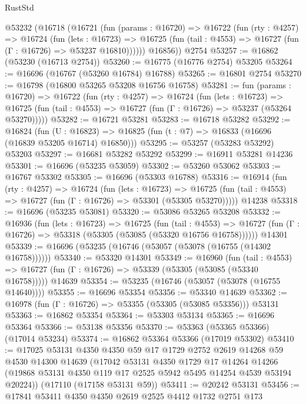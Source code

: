 \begin{lexlean}{RustStd}
\begin{coremodule}
    @53232
      (@16718
        (@16721
          (fun (params : @16720) =>
          @16722
            (fun (rty : @4257) =>
            @16724
              (fun (lets : @16723) =>
              @16725 (fun (tail : @4553) => @16727 (fun (Γ : @16726) => @53237 @16810))))))
        @16856))
    @2754
@53257 := @16862 (@53230 (@16713 @2754))
@53260 := @16775 (@16776 @2754) @53205
@53264 := @16696 (@16767 (@53260 @16784) @16788)
@53265 := @16801 @2754
@53270 := @16798 (@16800 @53265 @53208 @16756 @16758)
@53281 := fun (params : @16720) =>
  @16722
    (fun (rty : @4257) =>
    @16724
      (fun (lets : @16723) =>
      @16725 (fun (tail : @4553) => @16727 (fun (Γ : @16726) => @53237 (@53264 @53270)))))
@53282 := @16721 @53281
@53283 := @16718 @53282
@53292 := @16824
    (fun (U : @16823) => @16825 (fun (t : @7) => @16833 (@16696 (@16839 @53205 @16714) @16850)))
@53295 := @53257 (@53283 @53292) @53203
@53297 := @16681 @53282 @53292
@53299 := @16911 @53281 @14236
@53301 := @16696 (@53235 @53059)
@53302 := @53260 @53062
@53303 := @16767 @53302
@53305 := @16696 (@53303 @16788)
@53316 := @16914
    (fun (rty : @4257) =>
    @16724
      (fun (lets : @16723) =>
      @16725 (fun (tail : @4553) => @16727 (fun (Γ : @16726) => @53301 (@53305 @53270)))))
    @14238
@53318 := @16696 (@53235 @53081)
@53320 := @53086 @53265 @53208
@53332 := @16936
    (fun (lets : @16723) =>
    @16725
      (fun (tail : @4553) =>
      @16727 (fun (Γ : @16726) => @53318 (@53305 (@53085 (@53320 @16756 @16758))))))
    @14301
@53339 := @16696 (@53235 (@16746 (@53057 (@53078 (@16755 (@14302 @16758))))))
@53340 := @53320 @14301
@53349 := @16960
    (fun (tail : @4553) => @16727 (fun (Γ : @16726) => @53339 (@53305 (@53085 (@53340 @16758)))))
    @14639
@53354 := @53235 (@16746 (@53057 (@53078 (@16755 @14640))))
@53355 := @16696 @53354
@53356 := @53340 @14639
@53362 := @16978 (fun (Γ : @16726) => @53355 (@53305 (@53085 @53356))) @53131
@53363 := @16862 @53354
@53364 := @53303 @53134
@53365 := @16696 @53364
@53366 := @53138 @53356
@53370 := @53363 (@53365 @53366) (@17014 @53234)
@53374 := @16862 @53364 @53366 (@17019 @53302)
@53410 := @17025
    @53131
    @4350
    @4350
    @59
    @17
    @1729
    @2752
    @2619
    @14268
    @59
    @4530
    @14300
    @14639
    (@17042
      @53131
      @4350
      @1729
      @17
      @14264
      @14266
      (@19868 @53131 @4350 @119 @17 @2525 @5942 @5495 @14254 @4539 @53194 @20224))
    (@17110 (@17158 @53131 @59))
@53411 := @20242 @53131
@53456 := @17841
    @53411
    @4350
    @4350
    @2619
    @2525
    @4412
    @1732
    @2751
    @173

\end{coremodule}
\end{lexlean}
